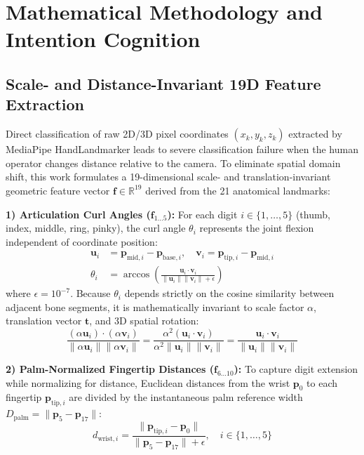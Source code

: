 \documentclass[journal]{IEEEtran}
\begin{document}
\section{Mathematical Methodology and Intention Cognition}

\subsection{Scale- and Distance-Invariant 19D Feature Extraction}
Direct classification of raw 2D/3D pixel coordinates $(x_k, y_k, z_k)$ extracted by MediaPipe HandLandmarker leads to severe classification failure when the human operator changes distance relative to the camera. To eliminate spatial domain shift, this work formulates a 19-dimensional scale- and translation-invariant geometric feature vector $\mathbf{f} \in \mathbb{R}^{19}$ derived from the 21 anatomical landmarks:

\textbf{1) Articulation Curl Angles ($\mathbf{f}_{1\dots5}$):} For each digit $i \in \{1,\dots,5\}$ (thumb, index, middle, ring, pinky), the curl angle $\theta_i$ represents the joint flexion independent of coordinate position:
\begin{align}
\mathbf{u}_i &= \mathbf{p}_{\text{mid}, i} - \mathbf{p}_{\text{base}, i}, \quad \mathbf{v}_i = \mathbf{p}_{\text{tip}, i} - \mathbf{p}_{\text{mid}, i} \\
\theta_i &= \arccos\left( \frac{\mathbf{u}_i \cdot \mathbf{v}_i}{\|\mathbf{u}_i\| \|\mathbf{v}_i\| + \epsilon} \right)
\end{align}
where $\epsilon = 10^{-7}$. Because $\theta_i$ depends strictly on the cosine similarity between adjacent bone segments, it is mathematically invariant to scale factor $\alpha$, translation vector $\mathbf{t}$, and 3D spatial rotation:
\begin{equation}
\frac{(\alpha \mathbf{u}_i) \cdot (\alpha \mathbf{v}_i)}{\|\alpha \mathbf{u}_i\| \|\alpha \mathbf{v}_i\|} = \frac{\alpha^2 (\mathbf{u}_i \cdot \mathbf{v}_i)}{\alpha^2 \|\mathbf{u}_i\| \|\mathbf{v}_i\|} = \frac{\mathbf{u}_i \cdot \mathbf{v}_i}{\|\mathbf{u}_i\| \|\mathbf{v}_i\|}
\end{equation}

\textbf{2) Palm-Normalized Fingertip Distances ($\mathbf{f}_{6\dots10}$):} To capture digit extension while normalizing for distance, Euclidean distances from the wrist $\mathbf{p}_0$ to each fingertip $\mathbf{p}_{\text{tip}, i}$ are divided by the instantaneous palm reference width $D_{\text{palm}} = \|\mathbf{p}_5 - \mathbf{p}_{17}\|$:
\begin{equation}
d_{\text{wrist}, i} = \frac{\|\mathbf{p}_{\text{tip}, i} - \mathbf{p}_0\|}{\|\mathbf{p}_5 - \mathbf{p}_{17}\| + \epsilon}, \quad i \in \{1,\dots,5\}
\end{equation}
\end{document}
